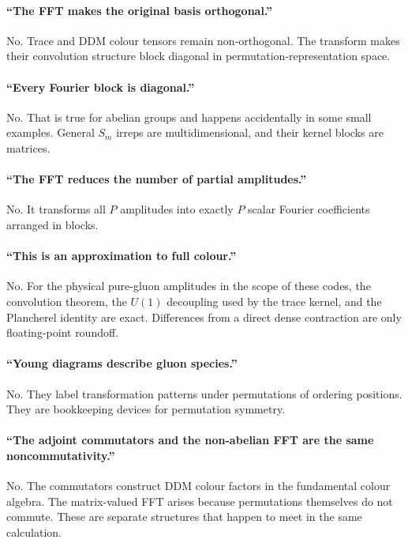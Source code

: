 \documentclass[11pt,a4paper]{article}
\begin{document}
\paragraph{``The FFT makes the original basis orthogonal.''}
No.  Trace and DDM colour tensors remain non-orthogonal.  The transform makes
their convolution structure block diagonal in permutation-representation
space.

\paragraph{``Every Fourier block is diagonal.''}
No.  That is true for abelian groups and happens accidentally in some small
examples.  General $S_m$ irreps are multidimensional, and their kernel
blocks are matrices.

\paragraph{``The FFT reduces the number of partial amplitudes.''}
No.  It transforms all $P$ amplitudes into exactly $P$ scalar Fourier
coefficients arranged in blocks.

\paragraph{``This is an approximation to full colour.''}
No.  For the physical pure-gluon amplitudes in the scope of these codes, the
convolution theorem, the $U(1)$ decoupling used by the trace kernel, and the
Plancherel identity are exact.  Differences from a direct dense contraction
are only floating-point roundoff.

\paragraph{``Young diagrams describe gluon species.''}
No.  They label transformation patterns under permutations of ordering
positions.  They are bookkeeping devices for permutation symmetry.

\paragraph{``The adjoint commutators and the non-abelian FFT are the same
noncommutativity.''}
No.  The commutators construct DDM colour factors in the fundamental colour
algebra.  The matrix-valued FFT arises because permutations themselves do not
commute.  These are separate structures that happen to meet in the same
calculation.
\end{document}
